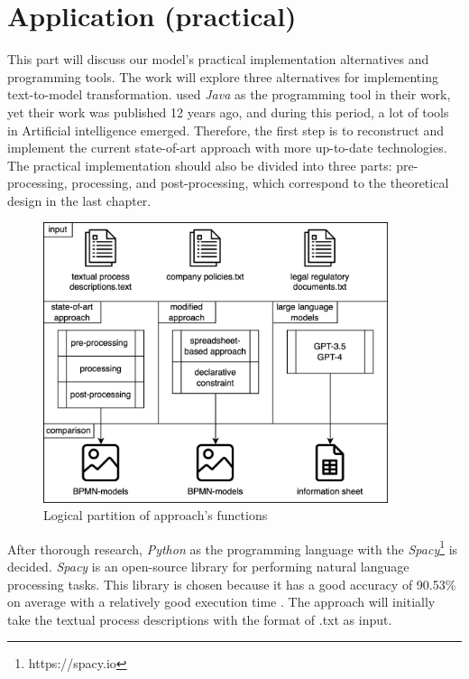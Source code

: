 \chapter{Application (practical)}
This part will discuss our model's practical implementation alternatives and programming tools. The work will explore three alternatives for implementing text-to-model transformation. \cite{t2m_1} used \textit{Java} as the programming tool in their work, yet their work was published 12 years ago, and during this period, a lot of tools in Artificial intelligence emerged. Therefore, the first step is to reconstruct and implement the current state-of-art approach with more up-to-date technologies. The practical implementation should also be divided into three parts: pre-processing, processing, and post-processing, which correspond to the theoretical design in the last chapter.


\begin{figure}[h]
    \centering
    \caption{Logical partition of approach's functions}
    \includegraphics[width=0.9\textwidth]{tum-resources/images/3-approaches.png}
\end{figure}


After thorough research, \textit{Python} as the programming language with the \textit{Spacy}\footnote{https://spacy.io} is decided. \textit{Spacy} is an open-source library for performing natural language processing tasks. This library is chosen because it has a good accuracy of 90.53\% on average with a relatively good execution time \cite{complement_1}. The approach will initially take the textual process descriptions with the format of .txt as input. 



